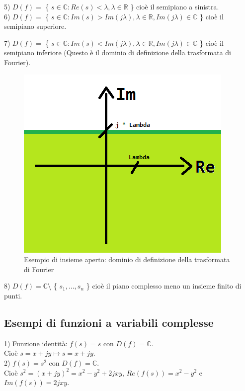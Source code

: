 5) $D(f) = $ \{ $ s \in \mathbb{C} : Re(s)< \lambda, \lambda \in \mathbb{R} $ \} cioè il semipiano a sinistra. \\ 
6) $D(f) = $ \{ $ s \in \mathbb{C} : Im(s) > Im(j\lambda ), \lambda \in \mathbb{R}, Im(j\lambda ) \in \mathbb{C} $ \} cioè il semipiano superiore. \\

\pagebreak

7) $D(f) = $ \{ $ s \in \mathbb{C} : Im(s) < Im(j\lambda ), \lambda \in \mathbb{R}, Im(j\lambda ) \in \mathbb{C} $ \} cioè il semipiano inferiore (Questo è il dominio di definizione della trasformata di Fourier).\\

\begin{figure}[h]
	\centering
	\includegraphics[scale=0.75]{immagini/dominioDefFourier}
	\caption{ Esempio di insieme aperto: dominio di definizione della trasformata di Fourier }
	\label{fig: dominioDefFourier}
\end{figure}

8) $ D(f) = \mathbb{C} \setminus$  \{ $ s_{1},...,s_{n}  $ \}  cioè il piano complesso meno un insieme finito di punti.


\subsection{Esempi di funzioni a variabili complesse}
1) Funzione identità: $ f(s) = s$ con $ D(f) = \mathbb{C}$.\\
Cioè $ s=x+jy \mapsto s=x+jy $.\\

2) $ f(s) = s^{2}$ con $ D(f) = \mathbb{C}$.\\
Cioè $ s^{2} = (x+jy)^{2} = x^{2}-y^{2} +2jxy $, $ Re(f(s)) = x^{2}-y^{2} $ e $ Im(f(s)) = 2jxy $. \\

